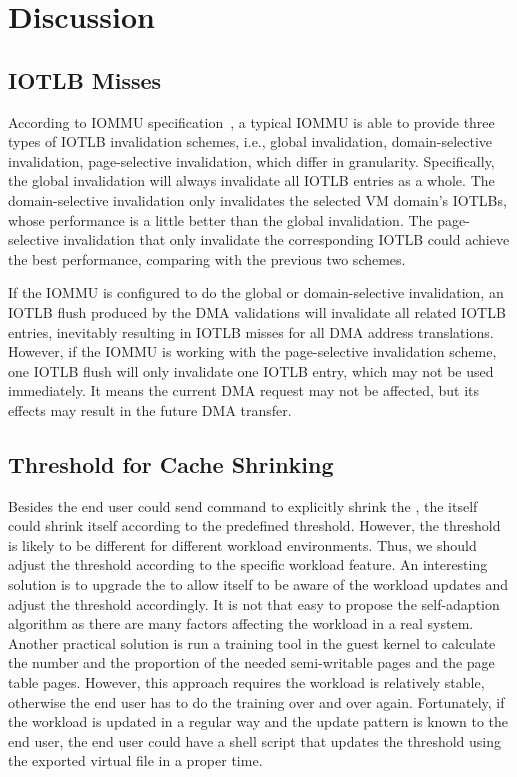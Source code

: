 \section{Discussion}\label{sec:dis}

\subsection{IOTLB Misses}
According to IOMMU specification~\cite{intelvt, amdvt}, a typical IOMMU is able to provide three types of IOTLB invalidation schemes, i.e., global invalidation, domain-selective invalidation, page-selective invalidation, which differ in granularity.
Specifically, the global invalidation will always invalidate all IOTLB entries as a whole.
The domain-selective invalidation only invalidates the selected VM domain's IOTLBs, whose performance is a little better than the global invalidation.
The page-selective invalidation that only invalidate the corresponding IOTLB could achieve the best performance, comparing with the previous two schemes.

If the IOMMU is configured to do the global or domain-selective invalidation, an IOTLB flush produced by the DMA validations will invalidate all related IOTLB entries, inevitably resulting in IOTLB misses for all DMA address translations. However, if the IOMMU is working with the page-selective invalidation scheme, one IOTLB flush will only invalidate one IOTLB entry, which may not be used immediately. It means the current DMA request may not be affected, but its effects may result in the future DMA transfer.

\subsection{Threshold for \name Cache Shrinking}
Besides the end user could send command to explicitly shrink the \cache, the \cache itself could shrink itself according to the predefined threshold.
However, the threshold is likely to be different for different workload environments. 
Thus, we should adjust the threshold according to the specific workload feature.
An interesting solution is to upgrade the \cache to allow itself to be aware of the workload updates and adjust the threshold accordingly.
It is not that easy to propose the self-adaption algorithm as there are many factors affecting the workload in a real system.
Another practical solution is run a training tool in the guest kernel to calculate the number and the proportion of the needed semi-writable pages and the page table pages.
However, this approach requires the workload is relatively stable, otherwise the end user has to do the training over and over again.
Fortunately, if the workload is updated in a regular way and the update pattern is known to the end user, the end user could have a shell script that updates the threshold using the exported virtual file in a proper time.


